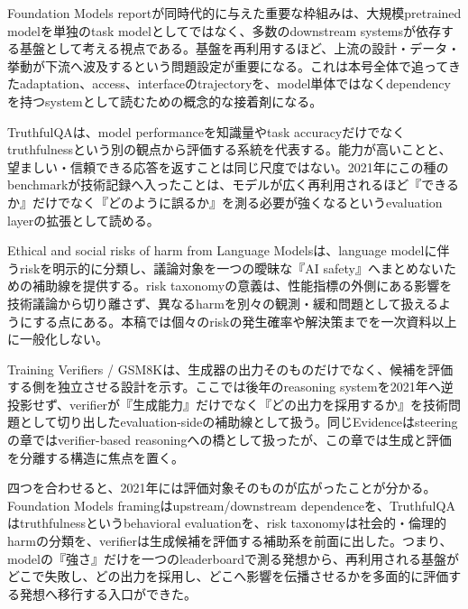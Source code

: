 
Foundation Models reportが同時代的に与えた重要な枠組みは、大規模pretrained modelを単独のtask modelとしてではなく、多数のdownstream systemsが依存する基盤として考える視点である。基盤を再利用するほど、上流の設計・データ・挙動が下流へ波及するという問題設定が重要になる。これは本号全体で追ってきたadaptation、access、interfaceのtrajectoryを、model単体ではなくdependencyを持つsystemとして読むための概念的な接着剤になる。\autocite{src-d9549fe4ff37}


TruthfulQAは、model performanceを知識量やtask accuracyだけでなくtruthfulnessという別の観点から評価する系統を代表する。能力が高いことと、望ましい・信頼できる応答を返すことは同じ尺度ではない。2021年にこの種のbenchmarkが技術記録へ入ったことは、モデルが広く再利用されるほど『できるか』だけでなく『どのように誤るか』を測る必要が強くなるというevaluation layerの拡張として読める。\autocite{src-8536f9ceae6d,src-c16f4ae139bf}


Ethical and social risks of harm from Language Modelsは、language modelに伴うriskを明示的に分類し、議論対象を一つの曖昧な『AI safety』へまとめないための補助線を提供する。risk taxonomyの意義は、性能指標の外側にある影響を技術議論から切り離さず、異なるharmを別々の観測・緩和問題として扱えるようにする点にある。本稿では個々のriskの発生確率や解決策までを一次資料以上に一般化しない。\autocite{src-20fd9bba2e7a}


Training Verifiers / GSM8Kは、生成器の出力そのものだけでなく、候補を評価する側を独立させる設計を示す。ここでは後年のreasoning systemを2021年へ逆投影せず、verifierが『生成能力』だけでなく『どの出力を採用するか』を技術問題として切り出したevaluation-sideの補助線として扱う。同じEvidenceはsteeringの章ではverifier-based reasoningへの橋として扱ったが、この章では生成と評価を分離する構造に焦点を置く。\autocite{src-34f845c1e710,src-750bc3eeb1bc}


四つを合わせると、2021年には評価対象そのものが広がったことが分かる。Foundation Models framingはupstream/downstream dependenceを、TruthfulQAはtruthfulnessというbehavioral evaluationを、risk taxonomyは社会的・倫理的harmの分類を、verifierは生成候補を評価する補助系を前面に出した。つまり、modelの『強さ』だけを一つのleaderboardで測る発想から、再利用される基盤がどこで失敗し、どの出力を採用し、どこへ影響を伝播させるかを多面的に評価する発想へ移行する入口ができた。\autocite{src-20fd9bba2e7a,src-34f845c1e710,src-750bc3eeb1bc,src-8536f9ceae6d,src-c16f4ae139bf,src-d9549fe4ff37}


